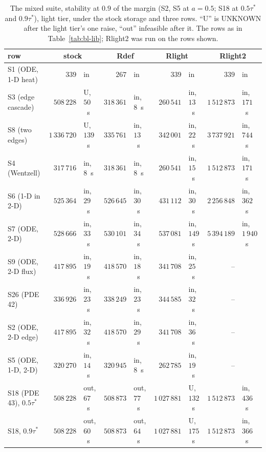\begin{table}[h]\centering\scriptsize
\setlength{\tabcolsep}{2pt}
\begin{tabular}{lrlrlrlrl}
\toprule
row & \multicolumn{2}{c}{stock} & \multicolumn{2}{c}{Rdef} & \multicolumn{2}{c}{Rlight} & \multicolumn{2}{c}{Rlight2} \\
\midrule
S1 (ODE, 1-D heat) & $339$ & in & $267$ & in & $339$ & in & $339$ & in \\
S3 (edge cascade) & $508\,228$ & U, $50$~s & $318\,361$ & in, $8$~s & $260\,541$ & in, $13$~s & $1\,512\,873$ & in, $171$~s \\
S8 (two edges) & $1\,336\,720$ & U, $139$~s & $335\,761$ & in, $13$~s & $342\,001$ & in, $22$~s & $3\,737\,921$ & in, $744$~s \\
S4 (Wentzell) & $317\,716$ & in, $8$~s & $318\,361$ & in, $8$~s & $260\,541$ & in, $15$~s & $1\,512\,873$ & in, $171$~s \\
S6 (1-D in 2-D) & $525\,364$ & in, $29$~s & $526\,645$ & in, $30$~s & $431\,112$ & in, $30$~s & $2\,256\,848$ & in, $362$~s \\
S7 (ODE, 2-D) & $528\,666$ & in, $33$~s & $530\,101$ & in, $34$~s & $537\,081$ & in, $149$~s & $5\,394\,189$ & in, $1\,940$~s \\
S9 (ODE, 2-D flux) & $417\,895$ & in, $19$~s & $418\,570$ & in, $18$~s & $341\,708$ & in, $25$~s & -- & \\
S26 (PDE 42) & $336\,926$ & in, $23$~s & $338\,249$ & in, $23$~s & $344\,585$ & in, $32$~s & -- & \\
S2 (ODE, 2-D edge) & $417\,895$ & in, $32$~s & $418\,570$ & in, $29$~s & $341\,708$ & in, $36$~s & -- & \\
S5 (ODE, 1-D, 2-D) & $320\,270$ & in, $14$~s & $320\,945$ & in, $8$~s & $262\,785$ & in, $19$~s & -- & \\
S18 (PDE 43), $0.5\tau^*$ & $508\,228$ & out, $67$~s & $508\,873$ & out, $77$~s & $1\,027\,881$ & U, $132$~s & $1\,512\,873$ & in, $436$~s \\
S18, $0.9\tau^*$ & $508\,228$ & out, $60$~s & $508\,873$ & out, $64$~s & $1\,027\,881$ & U, $175$~s & $1\,512\,873$ & in, $366$~s \\
\bottomrule
\end{tabular}
\caption{The mixed suite, stability  at $0.9$ of the margin (S2, S5 at $a=0.5$; S18 at $0.5\tau^*$ and $0.9\tau^*$), light tier, under the stock storage and three rows. ``U'' is UNKNOWN after the light tier's one raise, ``out'' infeasible after it. The rows as in Table~\ref{tab:bl-lib}; Rlight2 was run on the rows shown.}\label{tab:bl-mixed}
\end{table}

